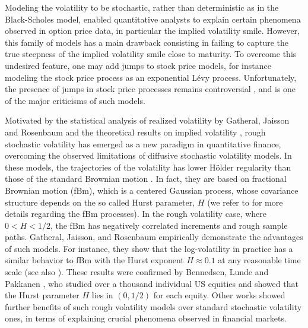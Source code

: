 Modeling the volatility to be stochastic, rather than deterministic as in the Black-Scholes model, enabled quantitative analysts to  explain certain phenomena observed in option price data, in particular the implied volatility smile. However, this family of models has a  main drawback consisting in failing  to capture the true steepness of the implied volatility smile close to maturity. To overcome this undesired feature, one may add jumps to stock price models, for instance modeling the stock price process as an exponential L\'evy process. Unfortunately, the presence of jumps in stock price processes remains controversial \cite{christensen2014fact,bajgrowicz2015jumps}, and is one of the major criticisms of such models. 



Motivated by the statistical analysis of realized volatility by Gatheral, Jaisson and Rosenbaum \cite{gatheral2014volatility} and the theoretical results on implied volatility  \cite{alos2007short,fukasawa2011asymptotic}, rough stochastic volatility has emerged as a new paradigm in quantitative finance, overcoming the observed limitations of  diffusive stochastic volatility models. In these models, the trajectories of the volatility  has lower H\"older regularity than those of the standard Brownian motion \cite{gatheral2014volatility,bayer2016pricing}. In fact, they are based on fractional Brownian motion (fBm), which  is a centered Gaussian process, whose covariance structure depends on  the so called Hurst parameter, $H$ (we refer to  \cite{mandelbrot1968fractional,coutin07introduction,biagini2008stochastic} for more details regarding the fBm processes). In the rough volatility case, where $0<H<1/2$, the fBm has negatively correlated increments and rough sample paths.   Gatheral, Jaisson, and Rosenbaum \cite{gatheral2014volatility}  empirically demonstrate the advantages of such models. For instance, they show that the log-volatility in practice has a similar behavior to  fBm with the Hurst exponent $H \approx 0.1$ at any reasonable time scale (see also  \cite{gatheral2014volatility_2}).  These results were confirmed  by Bennedsen, Lunde and Pakkanen \cite{bennedsen2016decoupling}, who studied over a thousand individual US equities and showed that the Hurst parameter $H$ lies in $(0,1/2)$ for each equity. Other  works \cite{gatheral2014volatility,bennedsen2016decoupling,bayer2016pricing} showed further benefits of  such rough volatility models over  standard stochastic volatility ones,   in terms of explaining crucial phenomena  observed in  financial markets.
 
